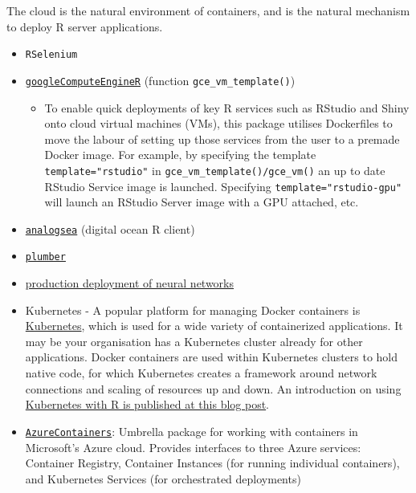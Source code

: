 \label{deployment}

The cloud is the natural environment of containers, and is the natural
mechanism to deploy R server applications.

\begin{itemize}
\tightlist
\item
  \texttt{RSelenium}
\item
  \href{https://cloudyr.github.io/googleComputeEngineR/}{\texttt{googleComputeEngineR}}
  (function \texttt{gce\_vm\_template()})

  \begin{itemize}
  \tightlist
  \item
    To enable quick deployments of key R services such as RStudio and
    Shiny onto cloud virtual machines (VMs), this package utilises
    Dockerfiles to move the labour of setting up those services from the
    user to a premade Docker image. For example, by specifying the
    template \texttt{template="rstudio"} in
    \texttt{gce\_vm\_template()/gce\_vm()} an up to date RStudio Service
    image is launched. Specifying \texttt{template="rstudio-gpu"} will
    launch an RStudio Server image with a GPU attached, etc.\\
  \end{itemize}
\item
  \href{https://github.com/sckott/analogsea}{\texttt{analogsea}}
  (digital ocean R client)
\item
  \href{https://www.rplumber.io/docs/hosting.html\#docker}{\texttt{plumber}}
\item
  \href{https://github.com/tmobile/r-tensorflow-api}{production
  deployment of neural networks} \citep[\citet{nolistic}]{jnolis}
\item
  Kubernetes - A popular platform for managing Docker containers is
  \href{https://kubernetes.io/}{Kubernetes}, which is used for a wide
  variety of containerized applications. It may be your organisation has
  a Kubernetes cluster already for other applications. Docker containers
  are used within Kubernetes clusters to hold native code, for which
  Kubernetes creates a framework around network connections and scaling
  of resources up and down. An introduction on using
  \href{https://code.markedmondson.me/r-on-kubernetes-serverless-shiny-r-apis-and-scheduled-scripts/}{Kubernetes
  with R is published at this blog post}.
\item
  \href{https://cran.r-project.org/package=AzureContainers}{\texttt{AzureContainers}}:
  Umbrella package for working with containers in Microsoft's Azure
  cloud. Provides interfaces to three Azure services: Container
  Registry, Container Instances (for running individual containers), and
  Kubernetes Services (for orchestrated deployments)
\end{itemize}

